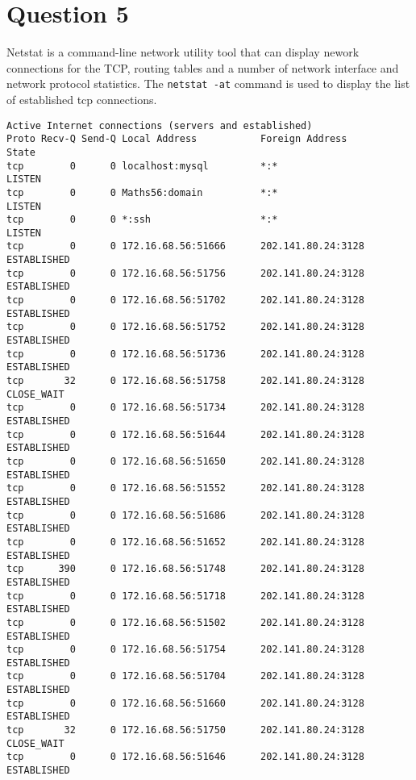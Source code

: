 \documentclass{article}
\begin{document}
	\section*{Question 5}

	Netstat is a command-line network utility tool that can display nework connections for the TCP, routing tables and a number of network interface and network protocol statistics. The \texttt{netstat -at} command is used to display the list of established tcp connections.	

\footnotesize
\begin{verbatim}
Active Internet connections (servers and established)
Proto Recv-Q Send-Q Local Address           Foreign Address         State      
tcp        0      0 localhost:mysql         *:*                     LISTEN     
tcp        0      0 Maths56:domain          *:*                     LISTEN     
tcp        0      0 *:ssh                   *:*                     LISTEN     
tcp        0      0 172.16.68.56:51666      202.141.80.24:3128      ESTABLISHED
tcp        0      0 172.16.68.56:51756      202.141.80.24:3128      ESTABLISHED
tcp        0      0 172.16.68.56:51702      202.141.80.24:3128      ESTABLISHED
tcp        0      0 172.16.68.56:51752      202.141.80.24:3128      ESTABLISHED
tcp        0      0 172.16.68.56:51736      202.141.80.24:3128      ESTABLISHED
tcp       32      0 172.16.68.56:51758      202.141.80.24:3128      CLOSE_WAIT 
tcp        0      0 172.16.68.56:51734      202.141.80.24:3128      ESTABLISHED
tcp        0      0 172.16.68.56:51644      202.141.80.24:3128      ESTABLISHED
tcp        0      0 172.16.68.56:51650      202.141.80.24:3128      ESTABLISHED
tcp        0      0 172.16.68.56:51552      202.141.80.24:3128      ESTABLISHED
tcp        0      0 172.16.68.56:51686      202.141.80.24:3128      ESTABLISHED
tcp        0      0 172.16.68.56:51652      202.141.80.24:3128      ESTABLISHED
tcp      390      0 172.16.68.56:51748      202.141.80.24:3128      ESTABLISHED
tcp        0      0 172.16.68.56:51718      202.141.80.24:3128      ESTABLISHED
tcp        0      0 172.16.68.56:51502      202.141.80.24:3128      ESTABLISHED
tcp        0      0 172.16.68.56:51754      202.141.80.24:3128      ESTABLISHED
tcp        0      0 172.16.68.56:51704      202.141.80.24:3128      ESTABLISHED
tcp        0      0 172.16.68.56:51660      202.141.80.24:3128      ESTABLISHED
tcp       32      0 172.16.68.56:51750      202.141.80.24:3128      CLOSE_WAIT 
tcp        0      0 172.16.68.56:51646      202.141.80.24:3128      ESTABLISHED

\end{verbatim}
\end{document}
